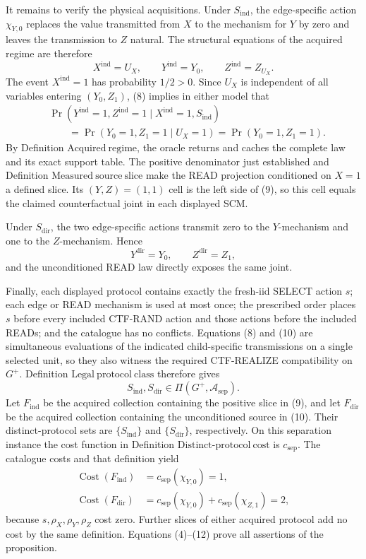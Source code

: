 It remains to verify the physical acquisitions.  Under \(S_{\mathrm{ind}}\), the edge-specific action \(\chi_{Y,0}\) replaces the value transmitted from \(X\) to the mechanism for \(Y\) by zero and leaves the transmission to \(Z\) natural.  The structural equations of the acquired regime are therefore
\[
 X^{\mathrm{ind}}=U_X,
 \qquad Y^{\mathrm{ind}}=Y_0,
 \qquad Z^{\mathrm{ind}}=Z_{U_X}.
\tag{8}
\]
The event \(X^{\mathrm{ind}}=1\) has probability \(1/2>0\).  Since \(U_X\) is independent of all variables entering \((Y_0,Z_1)\), (8) implies in either model that
\[
\begin{aligned}
 &\Pr\!\left(Y^{\mathrm{ind}}=1,Z^{\mathrm{ind}}=1
       \mid X^{\mathrm{ind}}=1,S_{\mathrm{ind}}\right)\\
 &\qquad=\Pr(Y_0=1,Z_1=1\mid U_X=1)
 =\Pr(Y_0=1,Z_1=1).
\end{aligned}
\tag{9}
\]
By Definition \(\mathrm{Acquired\ regime}\), the oracle returns and caches the complete law and its exact support table.  The positive denominator just established and Definition \(\mathrm{Measured\ source\ slice}\) make the READ projection conditioned on \(X=1\) a defined slice.  Its \((Y,Z)=(1,1)\) cell is the left side of (9), so this cell equals the claimed counterfactual joint in each displayed SCM.

Under \(S_{\mathrm{dir}}\), the two edge-specific actions transmit zero to the \(Y\)-mechanism and one to the \(Z\)-mechanism.  Hence
\[
 Y^{\mathrm{dir}}=Y_0,
 \qquad Z^{\mathrm{dir}}=Z_1,
\tag{10}
\]
and the unconditioned READ law directly exposes the same joint.

Finally, each displayed protocol contains exactly the fresh-iid SELECT action \(s\); each edge or READ mechanism is used at most once; the prescribed order places \(s\) before every included CTF-RAND action and those actions before the included READs; and the catalogue has no conflicts.  Equations (8) and (10) are simultaneous evaluations of the indicated child-specific transmissions on a single selected unit, so they also witness the required CTF-REALIZE compatibility on \(G^{+}\).  Definition \(\mathrm{Legal\ protocol\ class}\) therefore gives
\[
 S_{\mathrm{ind}},S_{\mathrm{dir}}\in\Pi(G^{+},\mathcal A_{\mathrm{sep}}).
\tag{11}
\]
Let \(F_{\mathrm{ind}}\) be the acquired collection containing the positive slice in (9), and let \(F_{\mathrm{dir}}\) be the acquired collection containing the unconditioned source in (10).  Their distinct-protocol sets are \(\{S_{\mathrm{ind}}\}\) and \(\{S_{\mathrm{dir}}\}\), respectively.  On this separation instance the cost function in Definition \(\mathrm{Distinct\text{-}protocol\ cost}\) is \(c_{\mathrm{sep}}\).  The catalogue costs and that definition yield
\[
\begin{aligned}
 \operatorname{Cost}(F_{\mathrm{ind}})
 &=c_{\mathrm{sep}}(\chi_{Y,0})=1,\\
 \operatorname{Cost}(F_{\mathrm{dir}})
 &=c_{\mathrm{sep}}(\chi_{Y,0})+c_{\mathrm{sep}}(\chi_{Z,1})=2,
\end{aligned}
\tag{12}
\]
because \(s,\rho_X,\rho_Y,\rho_Z\) cost zero.  Further slices of either acquired protocol add no cost by the same definition.  Equations (4)--(12) prove all assertions of the proposition.
